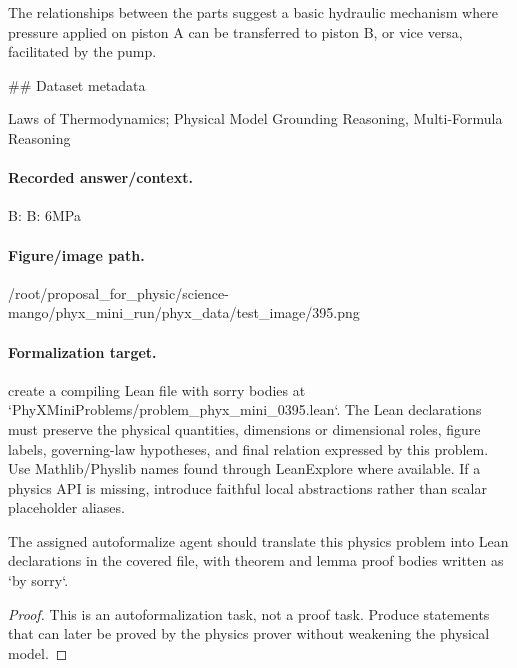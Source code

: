 The relationships between the parts suggest a basic hydraulic mechanism where pressure applied on piston A can be transferred to piston B, or vice versa, facilitated by the pump.

\#\# Dataset metadata

Laws of Thermodynamics; Physical Model Grounding Reasoning, Multi-Formula Reasoning

\paragraph{Recorded answer/context.}
B: B: 6MPa

\paragraph{Figure/image path.}
/root/proposal\_for\_physic/science-mango/phyx\_mini\_run/phyx\_data/test\_image/395.png

\paragraph{Formalization target.}
create a compiling Lean file with sorry bodies at `PhyXMiniProblems/problem\_phyx\_mini\_0395.lean`. The Lean declarations must preserve the physical quantities, dimensions or dimensional roles, figure labels, governing-law hypotheses, and final relation expressed by this problem.
Use Mathlib/Physlib names found through LeanExplore where available. If a physics API is missing, introduce faithful local abstractions rather than scalar placeholder aliases.

\begin{theorem}
\label{thm:physics:phyx_mini_0395:target}
The assigned autoformalize agent should translate this physics problem into Lean declarations in the covered file, with theorem and lemma proof bodies written as `by sorry`.
\end{theorem}
\begin{proof}
This is an autoformalization task, not a proof task. Produce statements that can later be proved by the physics prover without weakening the physical model.
\end{proof}

